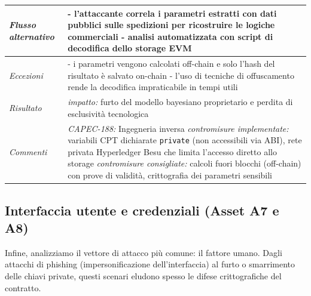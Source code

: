 \begin{longtable}{| >{\columncolor{abuseCol}}p{} | p{} |}
\hline
\textit{Flusso alternativo} & - l'attaccante correla i parametri estratti con dati pubblici sulle spedizioni per ricostruire le logiche commerciali \newline - analisi automatizzata con script di decodifica dello storage EVM \\
\hline
\textit{Eccezioni} & - i parametri vengono calcolati off-chain e solo l'hash del risultato è salvato on-chain \newline - l'uso di tecniche di offuscamento rende la decodifica impraticabile in tempi utili \\
\hline
\textit{Risultato} & \textit{impatto:} furto del modello bayesiano proprietario e perdita di esclusività tecnologica \\
\hline
\textit{Commenti} & \textit{CAPEC-188:} Ingegneria inversa \newline \textit{contromisure implementate:} variabili CPT dichiarate \texttt{private} (non accessibili via ABI), rete privata Hyperledger Besu che limita l'accesso diretto allo storage \newline \textit{contromisure consigliate:} calcoli fuori blocchi (off-chain) con prove di validità, crittografia dei parametri sensibili \\
\hline
\end{longtable}

\subsection{Interfaccia utente e credenziali (Asset A7 e A8)}
Infine, analizziamo il vettore di attacco più comune: il fattore umano. Dagli attacchi di phishing (impersonificazione dell'interfaccia) al furto o smarrimento delle chiavi private, questi scenari eludono spesso le difese crittografiche del contratto.

